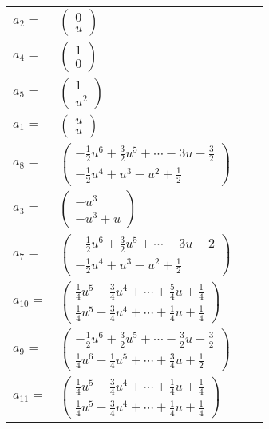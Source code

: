 \documentclass[1p]{elsarticle_modified}
\theoremstyle{definition}
\begin{document}
\begin{tabular}{m{7pt} m{180pt} m{7pt} m{180pt} }
\flushright $a_{2}=$&$\begin{pmatrix}0\\u\end{pmatrix}$ \\
\flushright $a_{4}=$&$\begin{pmatrix}1\\0\end{pmatrix}$ \\
\flushright $a_{5}=$&$\begin{pmatrix}1\\u^2\end{pmatrix}$ \\
\flushright $a_{1}=$&$\begin{pmatrix}u\\u\end{pmatrix}$ \\
\flushright $a_{8}=$&$\begin{pmatrix}-\frac{1}{2} u^6+\frac{3}{2} u^5+\cdots-3 u-\frac{3}{2}\\-\frac{1}{2} u^4+u^3- u^2+\frac{1}{2}\end{pmatrix}$ \\
\flushright $a_{3}=$&$\begin{pmatrix}- u^3\\- u^3+u\end{pmatrix}$ \\
\flushright $a_{7}=$&$\begin{pmatrix}-\frac{1}{2} u^6+\frac{3}{2} u^5+\cdots-3 u-2\\-\frac{1}{2} u^4+u^3- u^2+\frac{1}{2}\end{pmatrix}$ \\
\flushright $a_{10}=$&$\begin{pmatrix}\frac{1}{4} u^5-\frac{3}{4} u^4+\cdots+\frac{5}{4} u+\frac{1}{4}\\\frac{1}{4} u^5-\frac{3}{4} u^4+\cdots+\frac{1}{4} u+\frac{1}{4}\end{pmatrix}$ \\
\flushright $a_{9}=$&$\begin{pmatrix}-\frac{1}{2} u^6+\frac{3}{2} u^5+\cdots-\frac{3}{2} u-\frac{3}{2}\\\frac{1}{4} u^6-\frac{1}{4} u^5+\cdots+\frac{3}{4} u+\frac{1}{2}\end{pmatrix}$ \\
\flushright $a_{11}=$&$\begin{pmatrix}\frac{1}{4} u^5-\frac{3}{4} u^4+\cdots+\frac{1}{4} u+\frac{1}{4}\\\frac{1}{4} u^5-\frac{3}{4} u^4+\cdots+\frac{1}{4} u+\frac{1}{4}\end{pmatrix}$ \\

\end{tabular}
\end{document}
